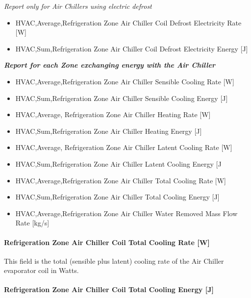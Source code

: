 \emph{Report only for Air Chillers using electric defrost}

\begin{itemize}
\item
  HVAC,Average,Refrigeration Zone Air Chiller Coil Defrost Electricity Rate {[}W{]}
\item
  HVAC,Sum,Refrigeration Zone Air Chiller Coil Defrost Electricity Energy {[}J{]}
\end{itemize}

\textbf{\emph{Report for each Zone exchanging energy with the Air Chiller}}

\begin{itemize}
\item
  HVAC,Average,Refrigeration Zone Air Chiller Sensible Cooling Rate {[}W{]}
\item
  HVAC,Sum,Refrigeration Zone Air Chiller Sensible Cooling Energy {[}J{]}
\item
  HVAC,Average, Refrigeration Zone Air Chiller Heating Rate {[}W{]}
\item
  HVAC,Sum,Refrigeration Zone Air Chiller Heating Energy {[}J{]}
\item
  HVAC,Average, Refrigeration Zone Air Chiller Latent Cooling Rate {[}W{]}
\item
  HVAC,Sum,Refrigeration Zone Air Chiller Latent Cooling Energy {[}J
\item
  HVAC,Average,Refrigeration Zone Air Chiller Total Cooling Rate {[}W{]}
\item
  HVAC,Sum,Refrigeration Zone Air Chiller Total Cooling Energy {[}J{]}
\item
  HVAC,Average,Refrigeration Zone Air Chiller Water Removed Mass Flow Rate {[}kg/s{]}
\end{itemize}

\paragraph{Refrigeration Zone Air Chiller Coil Total Cooling Rate {[}W{]}}\label{refrigeration-zone-air-chiller-coil-total-cooling-rate-w-1}

This field is the total (sensible plus latent) cooling rate of the Air Chiller evaporator coil in Watts.

\paragraph{Refrigeration Zone Air Chiller Coil Total Cooling Energy {[}J{]}}\label{refrigeration-zone-air-chiller-coil-total-cooling-energy-j}

